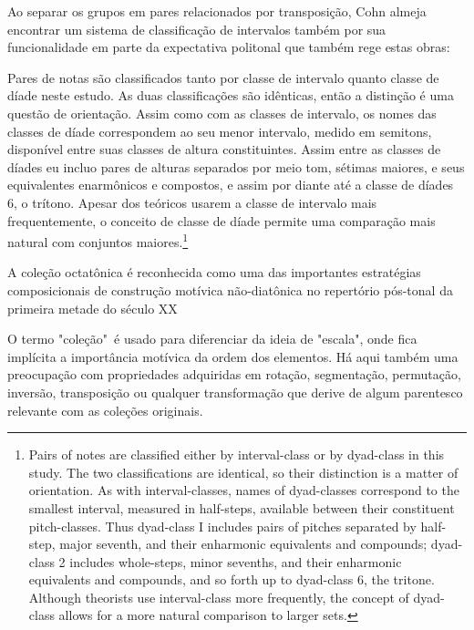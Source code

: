 \documentclass[
	12pt,				%
	openright,			%
	twoside,			%
	a4paper,			%
	english,			%
	french,				%
	spanish,			%
	brazil				%
	]{abntex2}
\begin{document}
Ao separar os grupos em pares relacionados por transposição, Cohn almeja encontrar um sistema de classificação de intervalos também por sua funcionalidade em parte da expectativa politonal que também rege estas obras:

\begin{citacao}
Pares de notas são classificados tanto por classe de intervalo quanto classe de díade neste estudo. As duas classificações são idênticas, então a distinção é uma questão de orientação. Assim como com as classes de intervalo, os nomes das classes de díade correspondem ao seu menor intervalo, medido em semitons, disponível entre suas classes de altura constituintes. Assim entre as classes de díades eu incluo pares de alturas separados por meio tom, sétimas maiores, e seus equivalentes enarmônicos e compostos, e assim por diante até a classe de díades 6, o trítono. Apesar dos teóricos usarem a classe de intervalo mais frequentemente, o conceito de classe de díade permite uma comparação mais natural com conjuntos maiores.\cite[p. 265-266]{cohn1991bartok}\footnote{Pairs of notes are classified either by interval-class or by dyad-class in this study. The two classifications are identical, so their distinction is a matter of orientation. As with interval-classes, names of dyad-classes correspond to the smallest interval, measured in half-steps, available between their constituent pitch-classes. Thus dyad-class I includes pairs of pitches separated by half-step, major seventh, and their enharmonic equivalents and compounds; dyad-class 2 includes whole-steps, minor sevenths, and their enharmonic equivalents and compounds, and so forth up to dyad-class 6, the tritone. Although theorists use interval-class more frequently, the concept of dyad-class allows for a more natural comparison to larger sets.\cite[p. 265-266]{cohn1991bartok}}
\end{citacao}

A coleção octatônica é reconhecida como uma das importantes estratégias composicionais de construção motívica não-diatônica no repertório pós-tonal da primeira metade do século XX \cite{berger1963problems,antokoletz1984music,lester1989analytic,forte1991debussy,straus2004,de2013simetria}

O termo "coleção"\ é usado para diferenciar da ideia de "escala", onde fica implícita a importância motívica da ordem dos elementos. Há aqui também uma preocupação com propriedades adquiridas em rotação, segmentação, permutação, inversão, transposição ou qualquer transformação que derive de algum parentesco relevante com as coleções originais.
\end{document}
